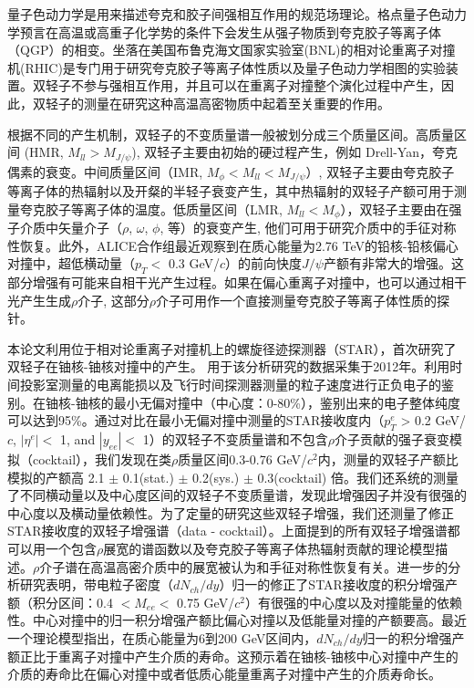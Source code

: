 ﻿\begin{cnabstract}
量子色动力学是用来描述夸克和胶子间强相互作用的规范场理论。格点量子色动力学预言在高温或高重子化学势的条件下会发生从强子物质到夸克胶子等离子体（QGP）的相变。坐落在美国布鲁克海文国家实验室(BNL)的相对论重离子对撞机(RHIC)是专门用于研究夸克胶子等离子体性质以及量子色动力学相图的实验装置。双轻子不参与强相互作用，并且可以在重离子对撞整个演化过程中产生，因此，双轻子的测量在研究这种高温高密物质中起着至关重要的作用。

根据不同的产生机制，双轻子的不变质量谱一般被划分成三个质量区间。高质量区间 (HMR, $M_{ll}>M_{J/\psi}$), 双轻子主要由初始的硬过程产生，例如 Drell-Yan，夸克偶素的衰变。中间质量区间（IMR, $M_{\phi}<M_{ll}<M_{J/\psi}$）, 双轻子主要由夸克胶子等离子体的热辐射以及开粲的半轻子衰变产生，其中热辐射的双轻子产额可用于测量夸克胶子等离子体的温度。低质量区间（LMR, $M_{ll}<M_{\phi}$），双轻子主要由在强子介质中矢量介子（$\rho$, $\omega$, $\phi$, 等）的衰变产生, 他们可用于研究介质中的手征对称性恢复。此外，ALICE合作组最近观察到在质心能量为2.76 TeV的铅核-铅核偏心对撞中，超低横动量（$p_{T}<$ 0.3 GeV/$c$）的前向快度$J/\psi$产额有非常大的增强。这部分增强有可能来自相干光产生过程。如果在偏心重离子对撞中，也可以通过相干光产生生成$\rho$介子, 这部分$\rho$介子可用作一个直接测量夸克胶子等离子体性质的探针。

本论文利用位于相对论重离子对撞机上的螺旋径迹探测器（STAR），首次研究了双轻子在铀核-铀核对撞中的产生。 用于该分析研究的数据采集于2012年。利用时间投影室测量的电离能损以及飞行时间探测器测量的粒子速度进行正负电子的鉴别。在铀核-铀核的最小无偏对撞中（中心度：0-80\%），鉴别出来的电子整体纯度可以达到95\%。通过对比在最小无偏对撞中测量的STAR接收度内（$p_{T}^{e}$ > 0.2 GeV/$c$, $|\eta^{e}|<$ 1, and $|y_{ee}|<$ 1）的双轻子不变质量谱和不包含$\rho$介子贡献的强子衰变模拟（cocktail），我们发现在类$\rho$质量区间0.3-0.76 GeV/$c^{2}$内，测量的双轻子产额比模拟的产额高 2.1 $\pm$ 0.1(stat.) $\pm$ 0.2(sys.) $\pm$ 0.3(cocktail) 倍。我们还系统的测量了不同横动量以及中心度区间的双轻子不变质量谱，发现此增强因子并没有很强的中心度以及横动量依赖性。为了定量的研究这些双轻子增强，我们还测量了修正STAR接收度的双轻子增强谱（data - cocktail）。上面提到的所有双轻子增强谱都可以用一个包含$\rho$展宽的谱函数以及夸克胶子等离子体热辐射贡献的理论模型描述。$\rho$介子谱在高温高密介质中的展宽被认为和手征对称性恢复有关。进一步的分析研究表明，带电粒子密度（$dN_{ch}/dy$）归一的修正了STAR接收度的积分增强产额（积分区间：0.4 $<M_{ee}<$ 0.75 GeV/$c^{2}$）有很强的中心度以及对撞能量的依赖性。中心对撞中的归一积分增强产额比偏心对撞以及低能量对撞的产额要高。最近一个理论模型指出，在质心能量为6到200 GeV区间内，$dN_{ch}/dy$归一的积分增强产额正比于重离子对撞中产生介质的寿命。这预示着在铀核-铀核中心对撞中产生的介质的寿命比在偏心对撞中或者低质心能量重离子对撞中产生的介质寿命长。


\end{cnabstract}
